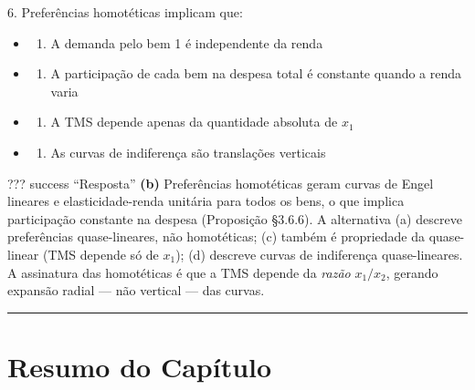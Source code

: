 \documentclass[11pt,twoside,openright]{book}
\providecommand{\tightlist}{\setlength{\itemsep}{0pt}\setlength{\parskip}{0pt}}
\begin{document}
\begin{infobox}{6. Preferências homotéticas implicam que:}

\begin{itemize}
\tightlist
\item
  \begin{enumerate}
  \def\labelenumi{(\alph{enumi})}
  \tightlist
  \item
    A demanda pelo bem 1 é independente da renda
  \end{enumerate}
\item
  \begin{enumerate}
  \def\labelenumi{(\alph{enumi})}
  \setcounter{enumi}{1}
  \tightlist
  \item
    A participação de cada bem na despesa total é constante quando a
    renda varia
  \end{enumerate}
\item
  \begin{enumerate}
  \def\labelenumi{(\alph{enumi})}
  \setcounter{enumi}{2}
  \tightlist
  \item
    A TMS depende apenas da quantidade absoluta de \(x_1\)
  \end{enumerate}
\item
  \begin{enumerate}
  \def\labelenumi{(\alph{enumi})}
  \setcounter{enumi}{3}
  \tightlist
  \item
    As curvas de indiferença são translações verticais
  \end{enumerate}
\end{itemize}

??? success ``Resposta'' \textbf{(b)} Preferências homotéticas geram
curvas de Engel lineares e elasticidade-renda unitária para todos os
bens, o que implica participação constante na despesa (Proposição
§3.6.6). A alternativa (a) descreve preferências quase-lineares, não
homotéticas; (c) também é propriedade da quase-linear (TMS depende só de
\(x_1\)); (d) descreve curvas de indiferença quase-lineares. A
assinatura das homotéticas é que a TMS depende da \emph{razão}
\(x_1/x_2\), gerando expansão radial --- não vertical --- das curvas.

\end{infobox}

\begin{center}\rule{0.5\linewidth}{0.5pt}\end{center}

\section{Resumo do Capítulo}\label{resumo-do-capuxedtulo}
\end{document}
